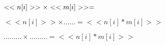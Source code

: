 \exo{}
\begin{multicols}{2}\noindent
\begin{spacing}{2}
$<<n[i]>>\times<<m[i]>>=\dotfill$

\end{spacing}
\end{multicols}

\exo{}
\begin{multicols}{2}\noindent
\begin{spacing}{2}
$<<n[i]>>\times\ldots\ldots=<<n[i]*m[i]>>$


\end{spacing}
\end{multicols}


\begin{multicols}{2}\noindent
\begin{spacing}{2}
$\ldots\ldots\ldots\times\ldots\ldots\ldots=<<n[i]*m[i]>>$


\end{spacing}
\end{multicols}